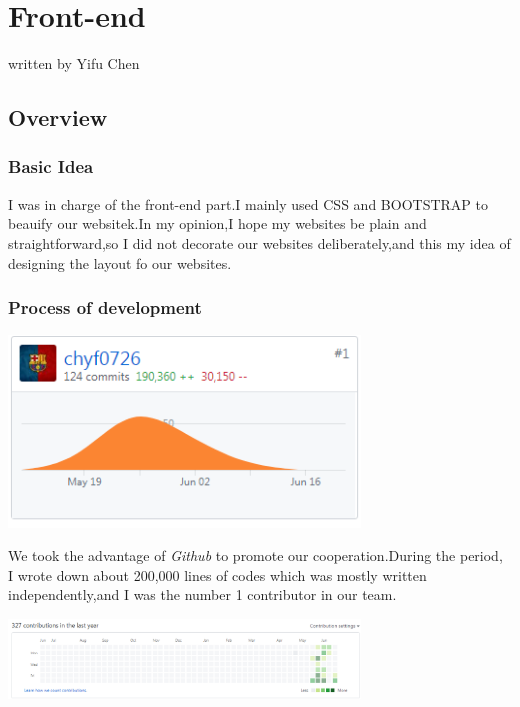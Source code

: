 \documentclass[10pt,twoside,a4paper,titlepage]{article}
\begin{document}
	\newpage
\section{Front-end}
written by Yifu Chen
	
	\subsection{Overview}
	
	\subsubsection{Basic Idea}
	
	I was in charge of the front-end part.I mainly used CSS and BOOTSTRAP to beauify our websitek.In my opinion,I hope my websites be plain and straightforward,so I did not decorate our websites deliberately,and this my idea of designing the layout fo our websites.
	
	\subsubsection{Process of development}
	
	\includegraphics[width=0.7\textwidth]{cyf/contribution.PNG}
	
	We took the advantage of \emph{Github} to promote our cooperation.During the period, I wrote down about 200,000 lines of codes which was mostly written independently,and I was the number 1 contributor in our team.
	
	\includegraphics[width=0.7\textwidth]{cyf/frequency.PNG}
	
\end{document}
